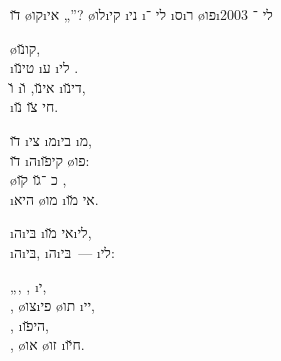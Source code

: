 \textheader%
{\u{דו} \o{קו}\i{אי}  „”?}
{ \o{לו}\i{קי}}
{}
{\i{ני} \i{לי} ־}
{\i{ס}\i{ר} \o{פו}\i{לי}}
{־}
{2003}

\begin{twocol}
\begin{stanza}
  \o{קו}\u{נו}, \\
\i{טי}\u{נו} \i{ע} \i{לי}   .\\
\u{ו}  \i{אי}\u{נו}, \u{ו}  \i{די}\u{נו},\\
  \i{חי} \u{צו} \u{נו}.
\end{stanza}

\begin{stanza}
\u{דו}  \i{צי} \i{מ}\i{בי} \i{מ},\\
\u{דו} \i{ה}\i{קי}\u{פו}  \o{פו}:\\
\o{כ}  ־\u{גו} \u{קו} ,\\
\i{היא} \o{מו} \i{אי}   \u{מו}.
\end{stanza}

\begin{stanza}
 \i{ה}\i{בּי} \i{אי} \u{מו}\i{לי},\\
\i{ה}\i{בּי}, \i{ה}\i{בּי}~—   \i{לי}:
\end{stanza}

\begin{stanza}
„, ,  \i{י},\\
,  \o{צו}\i{פי} \o{תו} \i{יי},\\
,     \i{הי}\u{פו},\\
,  \o{או}  \o{זו} \i{ח}\u{יו}.
\end{stanza}


\end{twocol}
